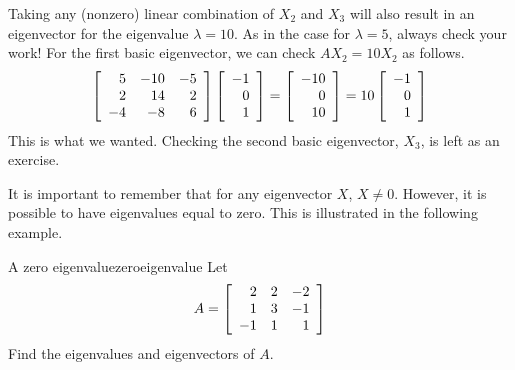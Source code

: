 \begin{solution}
Taking any (nonzero) linear combination of $X_2$ and $X_3$ will also result in an eigenvector for
the eigenvalue $\lambda =10.$ As in the case for $\lambda =5$, always check your work! 
For the first basic eigenvector,  we can check $AX_2 = 10 X_2$ as follows. 
\begin{equation*}
\left[ 
\begin{array}{rrr}
5 & -10 & -5 \\
2 & 14 & 2 \\
-4 & -8 & 6
\end{array}
\right] \left[
\begin{array}{r}
-1 \\
0 \\
1
\end{array}
\right] = \left[
\begin{array}{r}
-10 \\
0 \\
10
\end{array}
\right] =10\left[
\begin{array}{r}
-1 \\
0 \\
1
\end{array}
\right]
\end{equation*}
This is what we wanted. Checking the second basic eigenvector, $X_3$, is left as an exercise. 
\end{solution}

It is important to remember that for any eigenvector $X$, $X \neq 0$. However, it is possible 
to have eigenvalues equal to zero. This is illustrated in the following example. 

\begin{example}{A zero eigenvalue}{zeroeigenvalue}
Let
\begin{equation*}
A=\left[
\begin{array}{rrr}
2 & 2 & -2 \\
1 & 3 & -1 \\
-1 & 1 & 1
\end{array}
\right]
\end{equation*}
Find the eigenvalues and eigenvectors of $A$.
\end{example}

